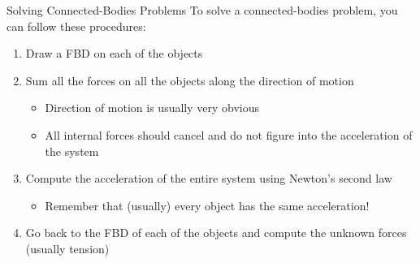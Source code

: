 \documentclass[12pt,compress,aspectratio=169]{beamer}
\begin{document}
\begin{frame}{Solving Connected-Bodies Problems}
  To solve a connected-bodies problem, you can follow these procedures:
  \begin{enumerate}
  \item Draw a FBD on each of the objects
  \item Sum all the forces on all the objects along the direction of motion
    \begin{itemize}
    \item Direction of motion is usually very obvious
    \item All internal forces should cancel and do not figure into the
      acceleration of the system
    \end{itemize}
  \item Compute the acceleration of the entire system using Newton's second law
    \begin{itemize}
    \item Remember that (usually) every object has the same acceleration!
    \end{itemize}
  \item Go back to the FBD of each of the objects and compute the unknown
    forces (usually tension)
  \end{enumerate}
\end{frame}



\end{document}
